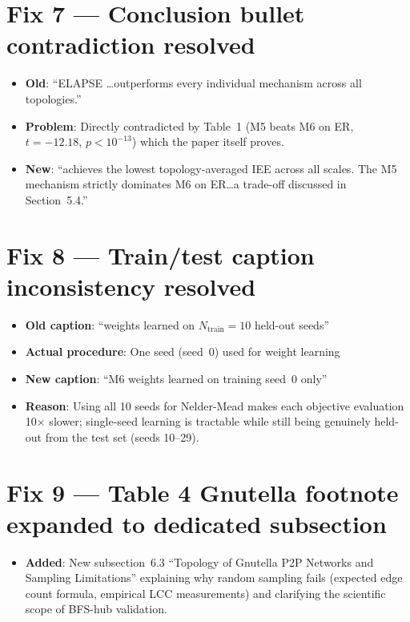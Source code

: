 \documentclass[11pt,a4paper]{article}
\begin{document}
\section*{Fix 7 — Conclusion bullet contradiction resolved}

\begin{itemize}
\item \textbf{Old}: ``ELAPSE \ldots outperforms every individual mechanism
  across all topologies.''
\item \textbf{Problem}: Directly contradicted by Table~1 (M5 beats M6 on ER,
  $t=-12.18$, $p<10^{-13}$) which the paper itself proves.
\item \textbf{New}: ``achieves the lowest topology-averaged IEE across all
  scales.  The M5 mechanism strictly dominates M6 on ER\ldots a trade-off
  discussed in Section~5.4.''
\end{itemize}

\section*{Fix 8 — Train/test caption inconsistency resolved}

\begin{itemize}
\item \textbf{Old caption}: ``weights learned on $N_{\mathrm{train}}=10$ held-out seeds''
\item \textbf{Actual procedure}: One seed (seed~0) used for weight learning
\item \textbf{New caption}: ``M6 weights learned on training seed~0 only''
\item \textbf{Reason}: Using all 10 seeds for Nelder-Mead makes each objective
  evaluation 10$\times$ slower; single-seed learning is tractable while still
  being genuinely held-out from the test set (seeds 10--29).
\end{itemize}

\section*{Fix 9 — Table 4 Gnutella footnote expanded to dedicated subsection}

\begin{itemize}
\item \textbf{Added}: New subsection~6.3 ``Topology of Gnutella P2P Networks
  and Sampling Limitations'' explaining why random sampling fails (expected edge
  count formula, empirical LCC measurements) and clarifying the scientific
  scope of BFS-hub validation.
\end{itemize}
\end{document}
